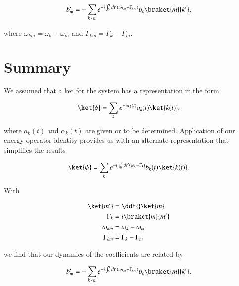 \begin{equation}\label{eqn:oneMoreAdiabatic:200}
b_m'
=-
\sum_{k \ne m}
e^{- i\int_0^t dt' ( \omega_{km} - \Gamma_{km} ) } 
b_k \braket{m}{k'},
\end{equation}

where $\omega_{km} = \omega_k - \omega_m$ and $\Gamma_{km} = \Gamma_k - \Gamma_m$.

\section{Summary}

We assumed that a ket for the system has a representation in the form

\begin{equation}\label{eqn:oneMoreAdiabatic:220}
\ket{\psi} 
= \sum_k e^{- i \alpha_k(t) } a_k(t) \ket{k(t)},
\end{equation}

where $a_k(t)$ and $\alpha_k(t)$ are given or to be determined.  Application of our energy operator identity provides us with an alternate representation that simplifies the results

\begin{equation}\label{eqn:oneMoreAdiabatic:220}
\ket{\psi} 
= \sum_k e^{- i\int_0^t dt' ( \omega_k - \Gamma_k ) } b_k(t) \ket{k(t)}.
\end{equation}

With

\begin{align}\label{eqn:oneMoreAdiabatic:260}
\ket{m'} &= \ddt{} \ket{m} \\
\Gamma_k &= i \braket{m}{m'} \\
\omega_{km} &= \omega_k - \omega_m \\
\Gamma_{km} &= \Gamma_k - \Gamma_m
\end{align}

we find that our dynamics of the coefficients are related by

\begin{equation}\label{eqn:oneMoreAdiabatic:280}
b_m'
=-
\sum_{k \ne m}
e^{- i\int_0^t dt' ( \omega_{km} - \Gamma_{km} ) } 
b_k \braket{m}{k'},
\end{equation}

\EndNoBibArticle
